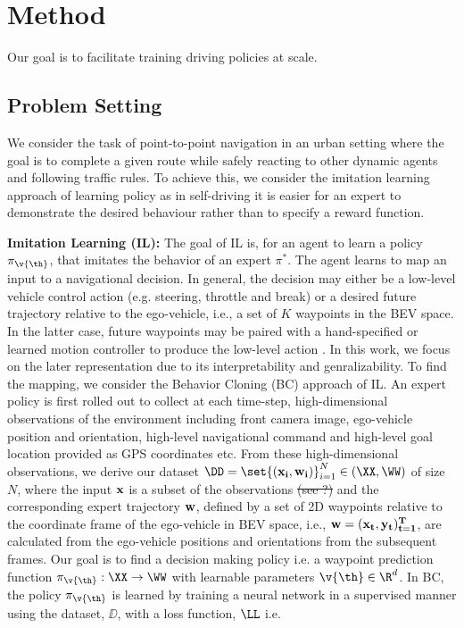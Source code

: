 \documentclass[letterpaper, 12pt]{article}
\theoremstyle{definition}
\theoremstyle{definition}
\theoremstyle{definition}
\theoremstyle{definition}
\theoremstyle{definition}
\begin{document}
\section{Method \label{org6f4e83b}}
\label{sec:orge10ef9f}
Our goal is to facilitate training driving policies at scale.


\subsection{Problem Setting \label{org1b9717d}}
\label{sec:org41374a1}
We consider the task of point-to-point navigation in an urban setting where
the goal is to complete a given route while safely reacting to other dynamic
agents and following traffic rules. To achieve this, we consider the imitation
learning approach of learning policy as in self-driving it is easier for an
expert to demonstrate the desired behaviour rather than to specify a reward
function.

\textbf{Imitation Learning (IL):} The goal of IL is, for an agent to learn a policy
 \(\pi_{\v{\th}}\), that imitates the behavior of an expert \(\pi^{*}\). The agent
 learns to map an input to a navigational decision. In general, the decision
 may either be a low-level vehicle control action \cite{Codevilla2019}
 (e.g. steering, throttle and break) or a desired future trajectory relative
 to the ego-vehicle, i.e., a set of \(K\) waypoints
 \cite{Chen2019,Mueller2018} in the BEV space. In the latter case, future
 waypoints may be paired with a hand-specified or learned motion controller to
 produce the low-level action \cite{Chen2019,Mueller2018}. In this work, we
 focus on the later representation due to its interpretability and
 genralizability. To find the mapping, we consider the Behavior Cloning (BC)
 approach of IL. An expert policy is first rolled out to collect at each
 time-step, high-dimensional observations of the environment including front
 camera image, ego-vehicle position and orientation, high-level navigational
 command and high-level goal location provided as GPS coordinates etc. From
 these high-dimensional observations, we derive our dataset \(\DD = \set{(\bf
   x_{i}, \bf w_{i})}_{i=1}^{N}\in(\XX,\WW)\) of size \(N\), where the input
 \(\bf x\) is a subset of the observations \sout{(see ?)} and the corresponding
 expert trajectory \(\bf w\), defined by a set of 2D waypoints relative to the
 coordinate frame of the ego-vehicle in BEV space, i.e., \(\bf
   w=(x_{t},y_{t})_{t=1}^{T}\), are calculated from the ego-vehicle positions
 and orientations from the subsequent frames. Our goal is to find a decision
 making policy i.e. a waypoint prediction function \(\pi_{\v{\th}}:\XX\to\WW\)
 with learnable parameters \(\v{\th}\in\R^{d}\). In BC, the policy
 \(\pi_{\v{\th}}\) is learned by training a neural network in a supervised
 manner using the dataset, \(\DD\), with a loss function, \(\LL\) i.e.
\end{document}
